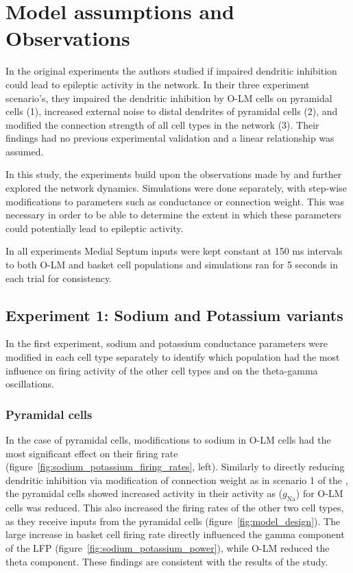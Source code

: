\section{Model assumptions and Observations}
In the original experiments \textcite{sanjayImpairedDendriticInhibition2015} the authors studied if impaired dendritic
inhibition could lead to epileptic activity in the network.
In their three experiment scenario's, they impaired the dendritic inhibition by O-LM cells on pyramidal cells (1), increased external noise to distal
dendrites of pyramidal cells (2), and modified the connection strength of all cell types in the network (3).
Their findings had no previous experimental validation and a linear relationship was assumed.

In this study, the experiments build upon the observations made by \textcite{sanjayImpairedDendriticInhibition2015} and further explored the network dynamics.
Simulations were done separately, with step-wise modifications to parameters such as conductance or connection weight.
This was necessary in order to be able to determine the extent in which these parameters could potentially lead to epileptic activity.

In all experiments Medial Septum inputs were kept constant at 150 ms intervals to both O-LM and basket cell populations
and simulations ran for 5 seconds in each trial for consistency.

\subsection{Experiment 1: Sodium and Potassium variants}
In the first experiment, sodium and potassium conductance parameters were modified
in each cell type separately to identify which population had the most influence
on firing activity of the other cell types and on the theta-gamma oscillations.

\subsubsection{Pyramidal cells}
In the case of pyramidal cells, modifications to sodium in O-LM cells had the most
significant effect on their firing rate (figure~\ref{fig:sodium_potassium_firing_rates}, left). Similarly to directly
reducing dendritic inhibition via modification of connection weight as in scenario 1 of the \textcite{sanjayImpairedDendriticInhibition2015},
the pyramidal cells showed increased activity in their activity as (\(g_{\text{Na}}\)) for O-LM cells was reduced.
This also increased the firing rates of the other two cell types, as they receive inputs from the
pyramidal cells (figure~\ref{fig:model_design}). The large increase in basket cell firing rate directly influenced
the gamma component of the LFP (figure~\ref{fig:sodium_potassium_power}), while O-LM reduced the theta component.
These findings are consistent with the results of the \textcite{sanjayImpairedDendriticInhibition2015} study.

